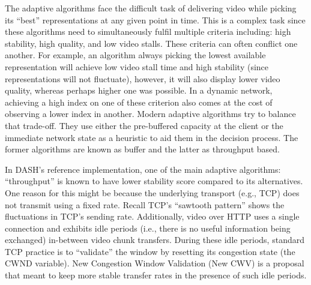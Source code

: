 \documentclass[10pt,sigconf]{acmart}
\begin{document}

The adaptive algorithms face the difficult task of delivering video while picking its ``best'' representations at any given point in time. This is a complex task since these algorithms need to simultaneously fulfil multiple criteria including: high stability, high quality, and low video stalls. These criteria can often conflict one another. For example, an algorithm always picking the lowest available representation will achieve low video stall time and high stability (since representations will not fluctuate), however, it will also display lower video quality, whereas perhaps higher one was possible. In a dynamic network, achieving a high index on one of these criterion also comes at the cost of observing a lower index in another. Modern adaptive algorithms try to balance that trade-off. They use either the pre-buffered capacity at the client or the immediate network state as a heuristic to aid them in the decision process. The former algorithms are known as buffer and the latter as throughput based. 

In DASH's reference implementation, one of the main adaptive algorithms: ``throughput'' is known to have lower stability score compared to its alternatives. One reason for this might be because the underlying transport (e.g., TCP) does not transmit using a fixed rate. Recall TCP's ``sawtooth pattern'' shows the fluctuations in TCP's sending rate. Additionally, video over HTTP uses a single connection and exhibits idle periods (i.e., there is no useful information being exchanged) in-between video chunk transfers. During these idle periods, standard TCP practice is to ``validate'' the window by resetting its congestion state (the CWND variable). New Congestion Window Validation (New CWV) is a proposal that meant to keep more stable transfer rates in the presence of such idle periods.

\end{document}
